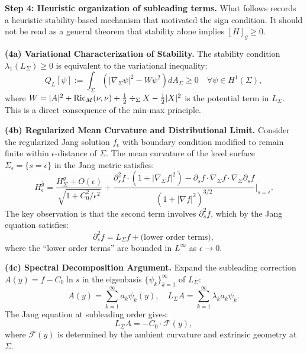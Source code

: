 \begin{remark}\label{rem:StabilityMechanism}\textbf{Step 4: Heuristic organization of subleading terms.}
What follows records a heuristic stability-based mechanism that motivated the sign condition. It should not be read as a general theorem that stability alone implies $[H]_{\bar{g}} \ge 0$.

\textbf{(4a) Variational Characterization of Stability.}
The stability condition $\lambda_1(L_\Sigma) \ge 0$ is equivalent to the variational inequality:
\begin{equation}\label{eq:StabilityVariational}
    Q_L[\psi] := \int_\Sigma \left( |\nabla_\Sigma \psi|^2 - W \psi^2 \right) dA_\Sigma \ge 0 \quad \forall \psi \in H^1(\Sigma),
\end{equation}
where $W = |A|^2 + \mathrm{Ric}_M(\nu, \nu) + \frac{1}{2}\div_\Sigma X - \frac{1}{2}|X|^2$ is the potential term in $L_\Sigma$. This is a direct consequence of the min-max principle.

\textbf{(4b) Regularized Mean Curvature and Distributional Limit.}
Consider the regularized Jang solution $f_\epsilon$ with boundary condition modified to remain finite within $\epsilon$-distance of $\Sigma$. The mean curvature of the level surface $\Sigma_\epsilon = \{s = \epsilon\}$ in the Jang metric satisfies:
\begin{equation}\label{eq:RegularizedMC}
    H^{\bar{g}}_\epsilon = \frac{H^g_\Sigma + O(\epsilon)}{\sqrt{1 + C_0^2/\epsilon^2}} + \frac{\partial_s^2 f \cdot (1 + |\nabla_\Sigma f|^2) - \partial_s f \cdot \nabla_\Sigma f \cdot \nabla_\Sigma \partial_s f}{(1 + |\nabla f|^2)^{3/2}}\Big|_{s=\epsilon}.
\end{equation}
The key observation is that the second term involves $\partial_s^2 f$, which by the Jang equation satisfies:
\begin{equation}
    \partial_s^2 f = L_\Sigma f + \text{(lower order terms)},
\end{equation}
where the ``lower order terms'' are bounded in $L^\infty$ as $\epsilon \to 0$.

\textbf{(4c) Spectral Decomposition Argument.}
Expand the subleading correction $A(y) = f - C_0 \ln s$ in the eigenbasis $\{\psi_k\}_{k=1}^\infty$ of $L_\Sigma$:
\begin{equation}
    A(y) = \sum_{k=1}^\infty a_k \psi_k(y), \quad L_\Sigma A = \sum_{k=1}^\infty \lambda_k a_k \psi_k.
\end{equation}
The Jang equation at subleading order gives:
\begin{equation}
    L_\Sigma A = -C_0 \cdot \mathcal{F}(y),
\end{equation}
where $\mathcal{F}(y)$ is determined by the ambient curvature and extrinsic geometry at $\Sigma$.


\end{remark}
